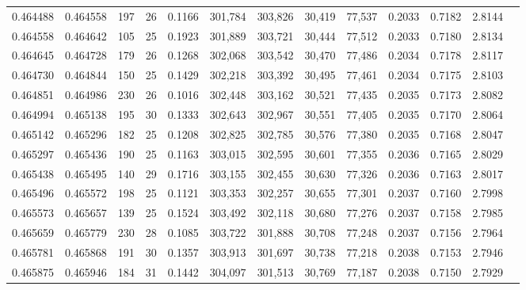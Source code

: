 \begin{tabular}{rrrrrrrrrrrrr}
0.464488 & 0.464558 & 197 &  26 &                                     0.1166 & 301,784 & 303,826 &  30,419 &  77,537 & 0.2033 & 0.7182 & 2.8144 \\
0.464558 & 0.464642 & 105 &  25 &                                     0.1923 & 301,889 & 303,721 &  30,444 &  77,512 & 0.2033 & 0.7180 & 2.8134 \\
0.464645 & 0.464728 & 179 &  26 &                                     0.1268 & 302,068 & 303,542 &  30,470 &  77,486 & 0.2034 & 0.7178 & 2.8117 \\
0.464730 & 0.464844 & 150 &  25 &                                     0.1429 & 302,218 & 303,392 &  30,495 &  77,461 & 0.2034 & 0.7175 & 2.8103 \\
0.464851 & 0.464986 & 230 &  26 &                                     0.1016 & 302,448 & 303,162 &  30,521 &  77,435 & 0.2035 & 0.7173 & 2.8082 \\
0.464994 & 0.465138 & 195 &  30 &                                     0.1333 & 302,643 & 302,967 &  30,551 &  77,405 & 0.2035 & 0.7170 & 2.8064 \\
0.465142 & 0.465296 & 182 &  25 &                                     0.1208 & 302,825 & 302,785 &  30,576 &  77,380 & 0.2035 & 0.7168 & 2.8047 \\
0.465297 & 0.465436 & 190 &  25 &                                     0.1163 & 303,015 & 302,595 &  30,601 &  77,355 & 0.2036 & 0.7165 & 2.8029 \\
0.465438 & 0.465495 & 140 &  29 &                                     0.1716 & 303,155 & 302,455 &  30,630 &  77,326 & 0.2036 & 0.7163 & 2.8017 \\
0.465496 & 0.465572 & 198 &  25 &                                     0.1121 & 303,353 & 302,257 &  30,655 &  77,301 & 0.2037 & 0.7160 & 2.7998 \\
0.465573 & 0.465657 & 139 &  25 &                                     0.1524 & 303,492 & 302,118 &  30,680 &  77,276 & 0.2037 & 0.7158 & 2.7985 \\
0.465659 & 0.465779 & 230 &  28 &                                     0.1085 & 303,722 & 301,888 &  30,708 &  77,248 & 0.2037 & 0.7156 & 2.7964 \\
0.465781 & 0.465868 & 191 &  30 &                                     0.1357 & 303,913 & 301,697 &  30,738 &  77,218 & 0.2038 & 0.7153 & 2.7946 \\
0.465875 & 0.465946 & 184 &  31 &                                     0.1442 & 304,097 & 301,513 &  30,769 &  77,187 & 0.2038 & 0.7150 & 2.7929 \\

\end{tabular}
